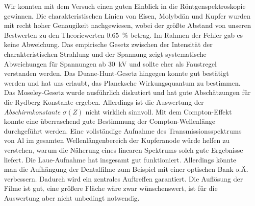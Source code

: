 \documentclass[paper=a4,fontsize=10pt,DIV=18,twocolumn,parskip=half]{scrartcl}
\numberwithin{equation}{section}    %
\begin{document}
Wir konnten mit dem Versuch einen guten Einblick in die Röntgenspektroskopie
gewinnen. Die charakteristischen Linien von Eisen, Molybdän und Kupfer wurden mit
recht hoher Genaugikeit nachgewiesen, wobei der größte Abstand von unseren
Bestwerten zu den Theoriewerten 
\SI{0.65}{\percent} betrag. Im Rahmen der Fehler gab es keine Abweichung. 
 Das empirische Gesetz zwischen der Intensität der
charakteristischen Strahlung und der Spannung zeigt systematische Abweichungen
für Spannungen ab \SI{30}{\kilo\volt} und sollte eher als Faustregel verstanden
werden. Das Duane-Hunt-Gesetz hingegen konnte gut bestätigt werden und hat uns
erlaubt, das Plancksche Wirkungsquantum zu bestimmen. Das Moseley-Gesetz wurde
ausführlich diskutiert und hat gute Abschätzungen für die Rydberg-Konstante
ergeben. Allerdings ist die Auswertung der \emph{Abschirmkonstante} $\sigma(Z)$
nicht wirklich sinnvoll. Mit dem Compton-Effekt konnte eine überraschend gute
Bestimmung der Compton-Wellenlänge durchgeführt werden. Eine vollständige
Aufnahme des Transmissionsspektrums von Al im gesamten Wellenlängenbereich der
Kupferanode würde helfen zu verstehen, warum die Näherung eines linearen
Spektrums solch gute Ergebnisse liefert. Die Laue-Aufnahme hat insgesamt gut
funktioniert. Allerdings könnte man die Aufhängung der Dentalfilme zum Beispiel
mit einer optischen Bank o.Ä. verbessern. Dadurch wird ein zentrales 
Auftreffen garantiert. Die Auflösung 
der Filme ist gut, eine größere Fläche wäre zwar wünschenswert, ist für die
Auswertung aber nicht unbedingt notwendig. 

%
%
%
%
\end{document}
